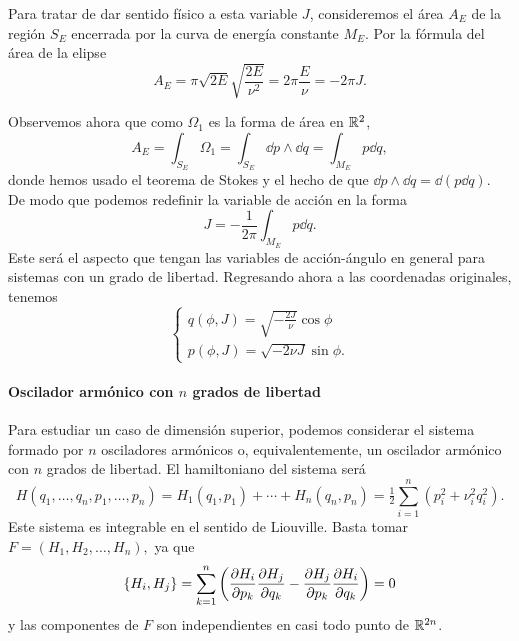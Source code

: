   Para tratar de dar sentido físico a esta variable $J$, consideremos el área $A_E$ de la región $S_E$ encerrada por la curva de energía constante $M_E$. Por la fórmula del área de la elipse
  \begin{equation*}
    A_E=\pi \sqrt{2E} \sqrt{\frac{2E}{\nu^2}} = 2 \pi \frac{E}{\nu}= -2\pi J.
  \end{equation*}

  Observemos ahora que como $\Omega_1$ es la forma de área en $\mathbb{R}^2$, 
  \begin{equation*}
    A_E=\int_{S_E}\Omega_1 = \int_{S_E} \dd p \wedge \dd q = \int_{M_E}p\dd q,
\end{equation*}
donde hemos usado el teorema de Stokes y el hecho de que $\dd p \wedge \dd q= \dd(p\dd q)$. De modo que podemos redefinir la variable de acción en la forma
\begin{equation*}
  J=-\frac{1}{2\pi}\int_{M_E}p \dd q.
\end{equation*}
Este será el aspecto que tengan las variables de acción-ángulo en general para sistemas con un grado de libertad. Regresando ahora a las coordenadas originales, tenemos
\begin{equation*}
  \begin{cases}
    q(\phi,J)=\sqrt{-\frac{2J}{ \nu}}\cos \phi\\
    p(\phi,J)=\sqrt{-2\nu J}\sin \phi.
  \end{cases}
\end{equation*}

\paragraph{\bf Oscilador armónico con $n$ grados de libertad}\mbox{}

  Para estudiar un caso de dimensión superior, podemos considerar el sistema formado por $n$ osciladores armónicos o, equivalentemente, un oscilador armónico con $n$ grados de libertad. El hamiltoniano del sistema será 
  \begin{equation*}
    H(q_1,\dots,q_n,p_1,\dots,p_n)= H_1(q_1,p_1)+ \cdots +H_n(q_n,p_n) = \tfrac{1}{2}\sum_{i=1}^n (p_i^2+\nu_i^2q_i^2).
  \end{equation*}
  Este sistema es integrable en el sentido de Liouville. Basta tomar $F=(H_1,H_2,\dots,H_n),$ ya que 
  \begin{equation*}
    \left\lbrace H_i,H_j\right\rbrace = \sum_{k=1}^n\left( \frac{\partial H_i}{\partial p_k}\frac{\partial H_j}{\partial q_k} - \frac{\partial H_j}{\partial p_k}\frac{\partial H_i}{\partial q_k}\right)=0
  \end{equation*}
  y las componentes de $F$ son independientes en casi todo punto de $\mathbb{R}^{2n}$. 
  
